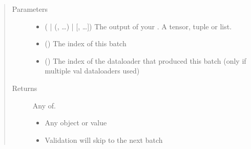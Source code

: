 \documentclass[letterpaper,10pt,english]{sphinxmanual}
\begin{document}
\begin{fulllineitems}
\begin{fulllineitems}
\begin{sphinxVerbatim}[commandchars=\\\{\}]
  \PYG{p}{[}\PYG{p}{]}
   
      
\end{sphinxVerbatim}
\begin{quote}\begin{description}
\item[{Parameters}] \leavevmode\begin{itemize}
\item {} 
\sphinxAtStartPar
{} ( | (, …) | {[}, …{]}) \textendash{} The output of your . A tensor, tuple or list.

\item {} 
\sphinxAtStartPar
{} () \textendash{} The index of this batch

\item {} 
\sphinxAtStartPar
{} () \textendash{} The index of the dataloader that produced this batch
(only if multiple val dataloaders used)

\end{itemize}

\item[{Returns}] \leavevmode
\sphinxAtStartPar

\sphinxAtStartPar
Any of.
\begin{itemize}
\item {} 
\sphinxAtStartPar
Any object or value

\item {} 
\sphinxAtStartPar
{} \sphinxhyphen{} Validation will skip to the next batch

\end{itemize}



\end{description}
\end{quote}
\end{fulllineitems}
\end{fulllineitems}
\end{document}

